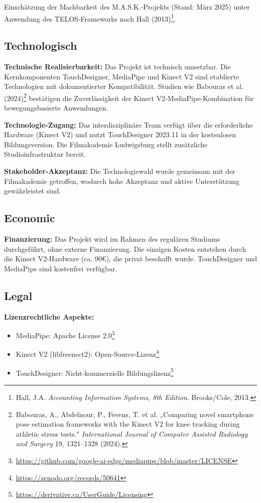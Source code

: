 Einschätzung der Machbarkeit des M.A.S.K.-Projekts (Stand: März 2025) unter Anwendung des TELOS-Frameworks nach Hall (2013)\footnote{Hall, J.A. \textit{Accounting Information Systems, 8th Edition}. Brooks/Cole, 2013.}.

\subsection{Technologisch}

\textbf{Technische Realisierbarkeit:}
Das Projekt ist technisch umsetzbar. Die Kernkomponenten TouchDesigner, MediaPipe und Kinect V2 sind etablierte Technologien mit dokumentierter Kompatibilität. Studien wie Babouras et al. (2024)\footnote{Babouras, A., Abdelnour, P., Fevens, T. et al. „Comparing novel smartphone pose estimation frameworks with the Kinect V2 for knee tracking during athletic stress tests." \textit{International Journal of Computer Assisted Radiology and Surgery} 19, 1321–1328 (2024).} bestätigen die Zuverlässigkeit der Kinect V2-MediaPipe-Kombination für bewegungsbasierte Anwendungen.

\textbf{Technologie-Zugang:}
Das interdisziplinäre Team verfügt über die erforderliche Hardware (Kinect V2) und nutzt TouchDesigner 2023.11 in der kostenlosen Bildungsversion. Die Filmakademie Ludwigsburg stellt zusätzliche Studioinfrastruktur bereit.

\textbf{Stakeholder-Akzeptanz:}
Die Technologiewahl wurde gemeinsam mit der Filmakademie getroffen, wodurch hohe Akzeptanz und aktive Unterstützung gewährleistet sind.

\subsection{Economic}

\textbf{Finanzierung:}
Das Projekt wird im Rahmen des regulären Studiums durchgeführt, ohne externe Finanzierung. Die einzigen Kosten entstehen durch die Kinect V2-Hardware (ca. 90€), die privat beschafft wurde. TouchDesigner und MediaPipe sind kostenfrei verfügbar.

\subsection{Legal}

\textbf{Lizenzrechtliche Aspekte:}
\begin{itemize}
    \item MediaPipe: Apache License 2.0\footnote{\url{https://github.com/google-ai-edge/mediapipe/blob/master/LICENSE}}
    \item Kinect V2 (libfreenect2): Open-Source-Lizenz\footnote{\url{https://zenodo.org/records/50641}}
    \item TouchDesigner: Nicht-kommerzielle Bildungslizenz\footnote{\url{https://derivative.ca/UserGuide/Licensing}}
\end{itemize}

